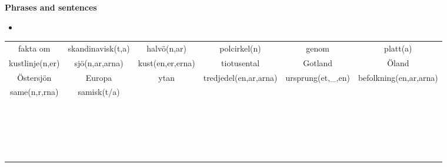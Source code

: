 
\begin{flushleft}
    \textbf{Phrases and sentences}
    \begin{itemize}
        \item 
    \end{itemize}
\end{flushleft}

\begin{center}
    \begin{adjustwidth}{-2.45cm}{}
        \begin{tabular}{|c c c c c c|}
            \hline
            fakta om & skandinavisk(t,a) & halvö(n,ar) & polcirkel(n) & genom & platt(a) \\
            kustlinje(n,er) & sjö(n,ar,arna) & kust(en,er,erna) & tiotusental & Gotland & Öland \\
            Östersjön & Europa & ytan & tredjedel(en,ar,arna) & ursprung(et,\_,en) & befolkning(en,ar,arna) \\
            same(n,r,rna) & samisk(t/a) &  &  &  &  \\
             &  &  &  &  &  \\
             &  &  &  &  &  \\
             &  &  &  &  &  \\
             &  &  &  &  &  \\
             &  &  &  &  &  \\
             &  &  &  &  &  \\
             &  &  &  &  &  \\
             &  &  &  &  &  \\
             &  &  &  &  &  \\
             &  &  &  &  &  \\
             &  &  &  &  &  \\
             &  &  &  &  &  \\
             &  &  &  &  &  \\
             &  &  &  &  &  \\
             &  &  &  &  &  \\
             &  &  &  &  &  \\
             &  &  &  &  &  \\
             &  &  &  &  &  \\
             &  &  &  &  &  \\
             &  &  &  &  &  \\

\end{tabular}
\end{adjustwidth}
\end{center}
